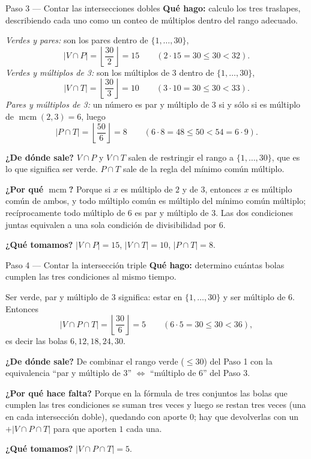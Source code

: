\documentclass[11pt]{article}
\begin{document}
\begin{paso}{Paso 3 --- Contar las intersecciones dobles}
\textbf{Qué hago:} calculo los tres traslapes, describiendo cada uno como un conteo de múltiplos dentro del rango adecuado.

\emph{Verdes y pares:} son los pares dentro de $\{1,\dots,30\}$,
\[
|V\cap P| = \left\lfloor \frac{30}{2} \right\rfloor = 15 \qquad (2\cdot 15 = 30 \le 30 < 32).
\]
\emph{Verdes y múltiplos de 3:} son los múltiplos de $3$ dentro de $\{1,\dots,30\}$,
\[
|V\cap T| = \left\lfloor \frac{30}{3} \right\rfloor = 10 \qquad (3\cdot 10 = 30 \le 30 < 33).
\]
\emph{Pares y múltiplos de 3:} un número es par y múltiplo de $3$ si y sólo si es múltiplo de $\operatorname{mcm}(2,3)=6$, luego
\[
|P\cap T| = \left\lfloor \frac{50}{6} \right\rfloor = 8 \qquad (6\cdot 8 = 48 \le 50 < 54 = 6\cdot 9).
\]

\textbf{¿De dónde sale?} $V\cap P$ y $V\cap T$ salen de restringir el rango a $\{1,\dots,30\}$, que es lo que significa ser verde. $P\cap T$ sale de la regla del mínimo común múltiplo.

\textbf{¿Por qué $\operatorname{mcm}$?} Porque si $x$ es múltiplo de $2$ y de $3$, entonces $x$ es múltiplo común de ambos, y todo múltiplo común es múltiplo del mínimo común múltiplo; recíprocamente todo múltiplo de $6$ es par y múltiplo de $3$. Las dos condiciones juntas equivalen a una sola condición de divisibilidad por $6$.

\textbf{¿Qué tomamos?} $|V\cap P|=15$, $|V\cap T|=10$, $|P\cap T|=8$.
\end{paso}

\begin{paso}{Paso 4 --- Contar la intersección triple}
\textbf{Qué hago:} determino cuántas bolas cumplen las tres condiciones al mismo tiempo.

Ser verde, par y múltiplo de $3$ significa: estar en $\{1,\dots,30\}$ y ser múltiplo de $6$. Entonces
\[
|V\cap P\cap T| = \left\lfloor \frac{30}{6} \right\rfloor = 5 \qquad (6\cdot 5 = 30 \le 30 < 36),
\]
es decir las bolas $6,12,18,24,30$.

\textbf{¿De dónde sale?} De combinar el rango verde ($\le 30$) del Paso 1 con la equivalencia ``par y múltiplo de $3$'' $\Leftrightarrow$ ``múltiplo de $6$'' del Paso 3.

\textbf{¿Por qué hace falta?} Porque en la fórmula de tres conjuntos las bolas que cumplen las tres condiciones se suman tres veces y luego se restan tres veces (una en cada intersección doble), quedando con aporte $0$; hay que devolverlas con un $+|V\cap P\cap T|$ para que aporten $1$ cada una.

\textbf{¿Qué tomamos?} $|V\cap P\cap T| = 5$.
\end{paso}
\end{document}
